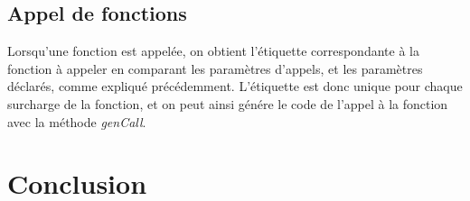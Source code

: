 \documentclass[11pt,a4paper]{report}
\begin{document}
\subsection{Appel de fonctions}

Lorsqu'une fonction est appelée, on obtient l'étiquette correspondante à la fonction à appeler en comparant les paramètres d'appels, et les paramètres déclarés, comme expliqué précédemment. 
L'étiquette est donc unique pour chaque surcharge de la fonction, et on peut ainsi génére le code de l'appel à la fonction avec la méthode \textsl{genCall}.


\section*{Conclusion}
\end{document}
